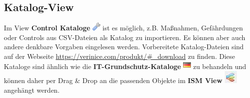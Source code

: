 \documentclass[a4paper,10pt]{book}
\begin{document}
\subsection{Katalog-View}
Im View \textbf{Control Kataloge}
\includegraphics[height=2ex]{Icon/Control_Kataloge.png} ist es möglich, z.B.
Maßnahmen, Gefährdungen oder Controls aus CSV-Dateien als Katalog zu
importieren. Es können aber auch andere denkbare Vorgaben eingelesen werden.
Vorbereitete Katalog-Dateien sind auf der Webseite
\url{https://verinice.com/produkt/#_download} zu finden. Diese Kataloge sind
ähnlich wie die \textbf{IT-Grundschutz-Kataloge}
\includegraphics[height=2ex]{Icon/GS_Kataloge.png} zu behandeln und können daher
per Drag \& Drop an die passenden Objekte im \textbf{ISM View}
\includegraphics[height=2ex]{Icon/Informationssicherheitsmodell.png} angehängt
werden.
\end{document}
